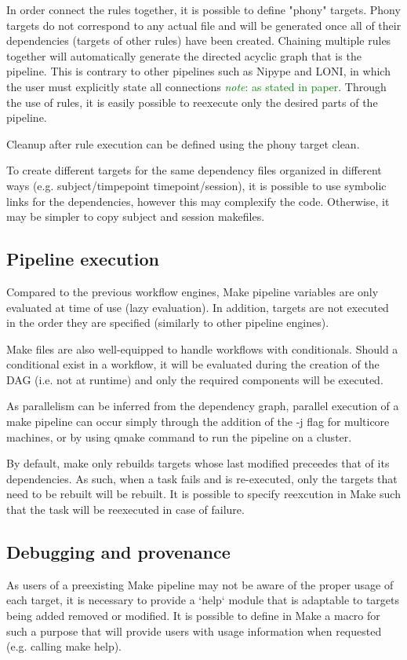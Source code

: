 \documentclass{report}
\newcommand{\note}[1]{\textcolor{green}{\textit{note}: #1}}
\begin{document}
In order connect the rules together, it is possible to define "phony" targets.
Phony targets do not correspond to any actual file and will be generated once
all of their dependencies (targets of other rules) have been
created. Chaining multiple rules together will automatically generate the directed acyclic
graph that is the pipeline. This is contrary to other pipelines such as Nipype
and LONI, in which the user must explicitly state all connections \note{as
stated in paper}. Through the use of rules, it is easily possible to reexecute
only the desired parts of the pipeline.

Cleanup after rule execution can be defined using the phony target
clean.

To create different targets for the same dependency files organized in different
ways (e.g. subject/timpepoint timepoint/session), it is possible to use symbolic
links for the dependencies, however this may complexify the code. Otherwise, it
may be simpler to copy subject and session makefiles.

        \subsection{Pipeline execution}

        Compared to the previous workflow engines, Make pipeline variables are
only evaluated at time of use (lazy evaluation). In addition, targets are not
executed in the order they are specified (similarly to other pipeline engines).

Make files are also well-equipped to handle workflows with conditionals. Should
a conditional exist in a workflow, it will be evaluated during the creation of
the DAG (i.e. not at runtime) and only the required components will be executed. 

        As parallelism can be inferred from the dependency graph, parallel execution of a make pipeline can occur simply through the
addition of the -j flag for multicore machines, or by using qmake command to run
the pipeline on a cluster.        

        By default, make only rebuilds targets whose last modified preceedes
that of its dependencies. As such, when a task fails and is re-executed, only the targets that need
to be rebuilt will be rebuilt. It is possible to specify reexcution in Make such
that the task will be reexecuted in case of failure.
 
        \subsection{Debugging and provenance}
        As users of a preexisting Make pipeline may not be aware of the proper
usage of each target, it is necessary to provide a `help` module that is
adaptable to targets being added removed or modified. It is possible to define
in Make a macro for such a purpose that will provide users with usage
information when requested (e.g. calling make help).
\end{document}
